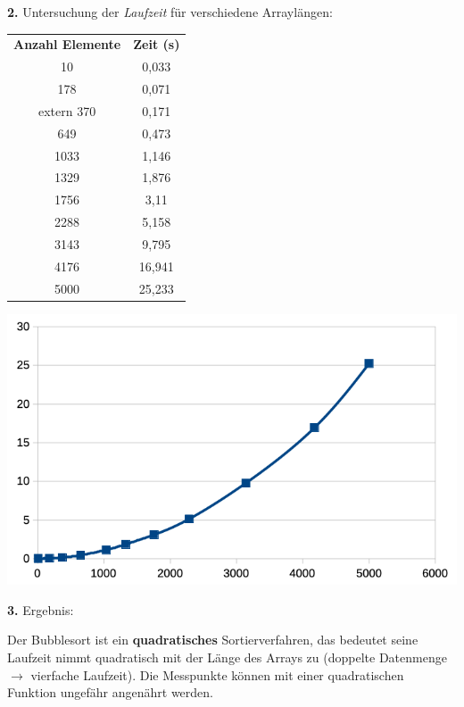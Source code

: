 \documentclass[11pt, a4paper]{arbeitsblatt}
\begin{document}
\begin{wrapfix}
\begin{figure}
\end{figure}
\textcolor{secondary}{\bfseries 2.} Untersuchung der \emph{Laufzeit} für verschiedene Arraylängen:

\begin{multicols}{2}\small
	\begin{tabular}{cc}
		\textbf{Anzahl Elemente} & \textbf{Zeit (s)} \\
		10 & 0,033 \\
		178 & 0,071 \\extern
		370 & 0,171 \\
		649 & 0,473 \\
		1033 & 1,146 \\
		1329 & 1,876 \\
		1756 & 3,11 \\
		2288 & 5,158 \\
		3143 & 9,795 \\
		4176 & 16,941 \\
		5000 & 25,233 \\
	\end{tabular}

	\includegraphics[width=\linewidth]{EF-AB.IV.4-Bubblesort_Chart.png}
\end{multicols}
\end{wrapfix}

\textcolor{secondary}{\bfseries 3.} Ergebnis:

Der Bubblesort ist ein \textbf{quadratisches} Sortierverfahren, das bedeutet seine Laufzeit nimmt
quadratisch mit der Länge des Arrays zu (doppelte Datenmenge $\longrightarrow$ vierfache Laufzeit).
Die Messpunkte können mit einer quadratischen Funktion ungefähr angenährt werden.
\end{document}
